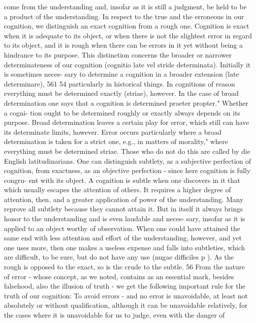 come from the understanding and, insofar as it is still a judgment, be held
to be a product of the understanding.
In respect to the true and the erroneous in our cognition, we distinguish
an exact cognition from a rough one.
Cognition is exact when it is adequate to its object, or when there is not
the slightest error in regard to its object, and it is rough when there can be
errors in it yet without being a hindrance to its purpose.
This distinction concerns the broader or narrower determinateness of our
cognition (cognitio late vel stride determinata). Initially it is sometimes neces-
sary to determine a cognition in a broader extension (late determinare),
561
54
particularly in historical things. In cognitions of reason everything must be
determined exactly (striae), however. In the case of broad determination
one says that a cognition is determined praeter propter." Whether a cogni-
tion ought to be determined roughly or exactly always depends on its
purpose. Broad determination leaves a certain play for error, which still
can have its determinate limits, however. Error occurs particularly where a
broad determination is taken for a strict one, e.g., in matters of morality,"
where everything must be determined striae. Those who do not do this are
called by die English latitudinarians.
One can distinguish subtlety, as a subjective perfection of cognition, from
exactness, as an objective perfection - since here cognition is fully congru-
ent with its object.
A cognition is subtle when one discovers in it that which usually escapes
the attention of others. It requires a higher degree of attention, then, and
a greater application of power of the understanding.
Many reprove all subtlety because they cannot attain it. But in itself it
always brings honor to the understanding and is even laudable and neces-
sary, insofar as it is applied to an object worthy of observation. When one
could have attained the same end with less attention and effort of the
understanding, however, and yet one uses more, then one makes a useless
expense and falls into subtleties, which are difficult, to be sure, but do not
have any use (nugae difficiles p ).
As the rough is opposed to the exact, so is the crude to the subtle.
56
From the nature of error - whose concept, as we noted, contains as an
essential mark, besides falsehood, also the illusion of truth - we get the
following important rule for the truth of our cognition:
To avoid errors - and no error is unavoidable, at least not absolutely or
without qualification, although it can be unavoidable relatively, for the
cases where it is unavoidable for us to judge, even with the danger of
